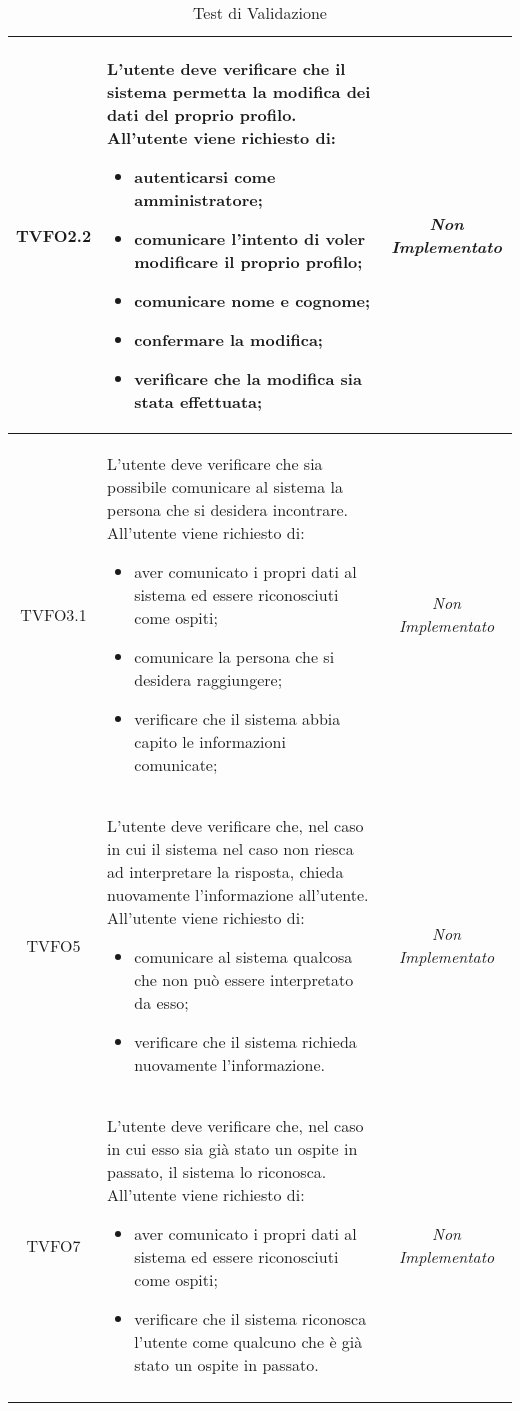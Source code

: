 \begin{longtable}{|c|>{}m{8cm}|c|}
\hypertarget{TVFO2.2}{TVFO2.2} & L'utente deve verificare che il sistema permetta la modifica dei dati del proprio profilo. All'utente viene richiesto di:
\begin{itemize}
\item autenticarsi come amministratore;
\item comunicare l'intento di voler modificare il proprio profilo;
\item comunicare nome e cognome;
\item confermare la modifica;
\item verificare che la modifica sia stata effettuata;
\end{itemize}
 & \textit{Non Implementato}\\ \hline
\hypertarget{TVFO3.1}{TVFO3.1} & L'utente deve verificare che sia possibile comunicare al sistema la persona che si desidera incontrare. All'utente viene richiesto di:
\begin{itemize}
\item aver comunicato i propri dati al sistema ed essere riconosciuti come ospiti;
\item comunicare la persona che si desidera raggiungere;
\item verificare che il sistema abbia capito le informazioni comunicate;
\end{itemize} & \textit{Non Implementato}\\ \hline
\hypertarget{TVFO5}{TVFO5} & L'utente deve verificare che, nel caso in cui il sistema nel caso non riesca ad interpretare la risposta, chieda nuovamente l'informazione all'utente. All'utente viene richiesto di:
\begin{itemize}
\item comunicare al sistema qualcosa che non può essere interpretato da esso;
\item verificare che il sistema richieda nuovamente l'informazione.
\end{itemize} & \textit{Non Implementato}\\ \hline
\hypertarget{TVFO7}{TVFO7} & L'utente deve verificare che, nel caso in cui esso sia già stato un ospite in passato, il sistema lo riconosca. All'utente viene richiesto di:
\begin{itemize}
\item aver comunicato i propri dati al sistema ed essere riconosciuti come ospiti;
\item verificare che il sistema riconosca l'utente come qualcuno che è già stato un ospite in passato.
\end{itemize}
 & \textit{Non Implementato}\\ \hline
\caption[Test di Validazione]{Test di Validazione}
\label{tabella:test0}
\end{longtable}
\clearpage

